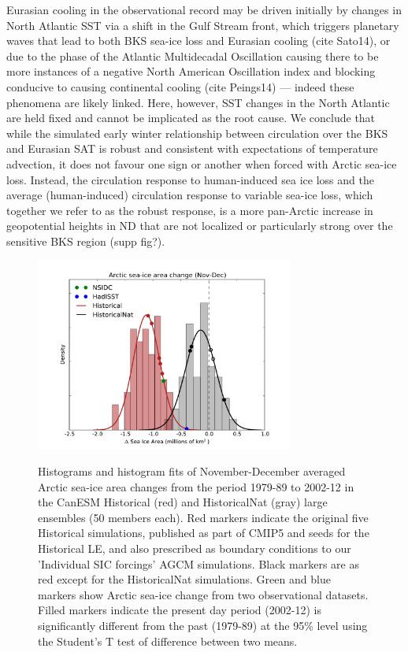 \documentclass[grl]{AGUTeX}  %
\begin{document}
\begin{article}
Eurasian cooling in the observational record may be driven initially by changes in North Atlantic SST via a shift in the Gulf Stream front, which triggers planetary waves that lead to both BKS sea-ice loss and Eurasian cooling (cite Sato14), or due to the phase of the Atlantic Multidecadal Oscillation causing there to be more instances of a negative North American Oscillation index and blocking conducive to causing continental cooling (cite Peings14) --- indeed these phenomena are likely linked. Here, however, SST changes in the North Atlantic are held fixed and cannot be implicated as the root cause. We conclude that while the simulated early winter relationship between circulation over the BKS and Eurasian SAT is robust and consistent with expectations of temperature advection, it does not favour one sign or another when forced with Arctic sea-ice loss. Instead, the circulation response to human-induced sea ice loss and the average (human-induced) circulation response to variable sea-ice loss, which together we refer to as the robust response, is a more pan-Arctic increase in geopotential heights in ND that are not localized or particularly strong over the sensitive BKS region (supp fig?). 


\begin{figure}[t] %
  \noindent\includegraphics[width=20pc,angle=0]{fig1.pdf} \\ 
  \caption{Histograms and histogram fits of November-December averaged Arctic sea-ice area changes from the period 1979-89 to 2002-12 in the CanESM Historical (red) and HistoricalNat (gray) large ensembles (50 members each). Red markers indicate the original five Historical simulations, published as part of CMIP5 and seeds for the Historical LE, and also prescribed as boundary conditions to our 'Individual SIC forcings' AGCM simulations. Black markers are as red except for the HistoricalNat simulations. Green and blue markers show Arctic sea-ice change from two observational datasets. Filled markers indicate the present day period (2002-12) is significantly different from the past (1979-89) at the 95\% level using the Student's T test of difference between two means.
}\label{fig:fig1}
\end{figure}


\end{article}
\end{document}
